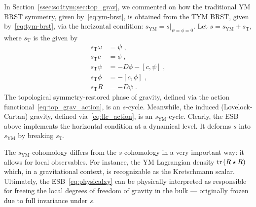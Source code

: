 \documentclass[../main.tex]{subfiles}
\begin{document}
In Section~\ref{ssec:so4tym;sec:top_grav}, we commented on how the traditional YM BRST symmetry, given by~\eqref{eq:ym-brst}, is obtained from the TYM BRST, given by~\eqref{eq:tym-brst}, via the horizontal condition: $ s_{\text{YM}} = s|_{\psi = \phi = 0} $. Let $ s = s_{\text{YM}} + s_{\text{T}} $, where $ s_{\text{T}} $ is the  given by
\begin{subequations}%
  \label{eq:s_T}
  \begin{align}
    s_{\text{T}} \omega & = \psi \;,                              \\
    s_{\text{T}} c      & = \phi \;,                              \\
    s_{\text{T}} \psi   & = - D \phi - \left[ c, \psi \right] \;, \\
    s_{\text{T}} \phi   & = - \left[ c, \phi \right] \;,          \\
    s_{\text{T}} R      & = - D \psi \;.
  \end{align}
\end{subequations}
The topological symmetry-restored phase of gravity, defined via the action functional~\eqref{eq:top_grav_action}, is an $s$-cycle. Meanwhile, the induced (Lovelock-Cartan) gravity, defined via~\eqref{eq:llc_action}, is an $ s_{\text{YM}} $-cycle. Clearly, the ESB above implements the horizontal condition at a dynamical level. It deforms $ s $ into $ s_{\text{YM}} $ by breaking $ s_{\text{T}} $.

The $ s_{\text{YM}} $-cohomology differs from the $ s $-cohomology in a very important way: it allows for local observables. For instance, the YM Lagrangian density $ \operatorname{tr} \left( R \star R \right) $ which, in a gravitational context, is recognizable as the Kretschmann scalar. Ultimately, the ESB~\eqref{eq:physicalxy} can be physically interpreted as responsible for freeing the local degrees of freedom of gravity in the bulk --- originally frozen due to full invariance under $s$.
\end{document}
